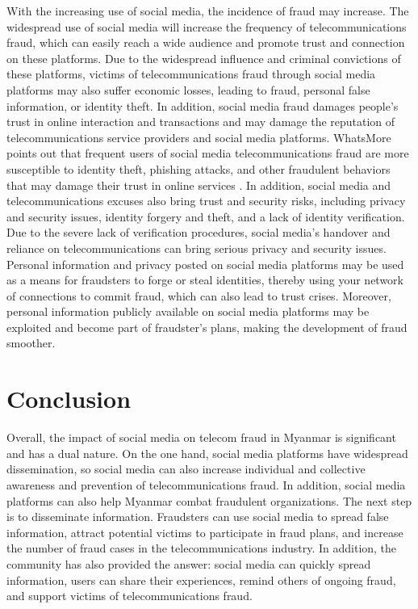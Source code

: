 \documentclass[man,floatsintext]{apa7}
\begin{document}
With the increasing use of social media, the incidence of fraud may increase. The widespread use of social media will increase the frequency of telecommunications fraud, which can easily reach a wide audience and promote trust and connection on these platforms. Due to the widespread influence and criminal convictions of these platforms, victims of telecommunications fraud through social media platforms may also suffer economic losses, leading to fraud, personal false information, or identity theft. In addition, social media fraud damages people's trust in online interaction and transactions and may damage the reputation of telecommunications service providers and social media platforms. WhatsMore points out that frequent users of social media telecommunications fraud are more susceptible to identity theft, phishing attacks, and other fraudulent behaviors that may damage their trust in online services \autocite{ilzanUnderstandingPhenomenonRisks2023}. In addition, social media and telecommunications excuses also bring trust and security risks, including privacy and security issues, identity forgery and theft, and a lack of identity verification. Due to the severe lack of verification procedures, social media's handover and reliance on telecommunications can bring serious privacy and security issues. Personal information and privacy posted on social media platforms may be used as a means for fraudsters to forge or steal identities, thereby using your network of connections to commit fraud, which can also lead to trust crises. Moreover, personal information publicly available on social media platforms may be exploited and become part of fraudster's plans, making the development of fraud smoother.

\section{Conclusion}

Overall, the impact of social media on telecom fraud in Myanmar is significant and has a dual nature. On the one hand, social media platforms have widespread dissemination, so social media can also increase individual and collective awareness and prevention of telecommunications fraud. In addition, social media platforms can also help Myanmar combat fraudulent organizations. The next step is to disseminate information. Fraudsters can use social media to spread false information, attract potential victims to participate in fraud plans, and increase the number of fraud cases in the telecommunications industry. In addition, the community has also provided the answer: social media can quickly spread information, users can share their experiences, remind others of ongoing fraud, and support victims of telecommunications fraud.
\end{document}
